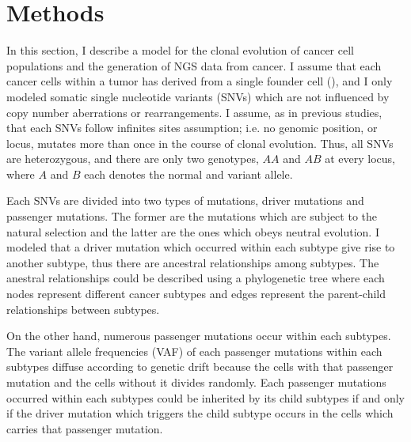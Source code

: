 \documentclass{article}
\begin{document}
        
 \section{Methods}

In this section, I describe a model for the clonal evolution of cancer cell populations and the generation of NGS data from cancer.
I assume that each cancer cells within a tumor has derived from a single founder cell (), and I only modeled somatic single nucleotide variants (SNVs) which are not influenced by copy number aberrations or rearrangements. I assume, as in previous studies, that each SNVs follow infinites sites assumption; i.e. no genomic position, or locus, mutates more than once in the course of clonal evolution. Thus, all SNVs are heterozygous, and there are only two genotypes, $AA$ and $AB$ at every locus, where $A$ and $B$ each denotes the normal and variant allele.

Each SNVs are divided into two types of mutations, driver mutations and passenger mutations. The former are the mutations which are subject to the natural selection and the latter are the ones which obeys neutral evolution. I modeled that a driver mutation which occurred within each subtype give rise to another subtype, thus there are ancestral relationships among subtypes. The anestral relationships could be described using a phylogenetic tree where each nodes represent different cancer subtypes and edges represent the parent-child relationships between subtypes.

On the other hand, numerous passenger mutations occur within each subtypes. The variant allele frequencies (VAF) of each passenger mutations within each subtypes diffuse according to genetic drift because the cells with that passenger mutation and the cells without it divides randomly. Each passenger mutations occurred within each subtypes could be inherited by its child subtypes if and only if the driver mutation which triggers the child subtype occurs in the cells which carries that passenger mutation.
\end{document}

